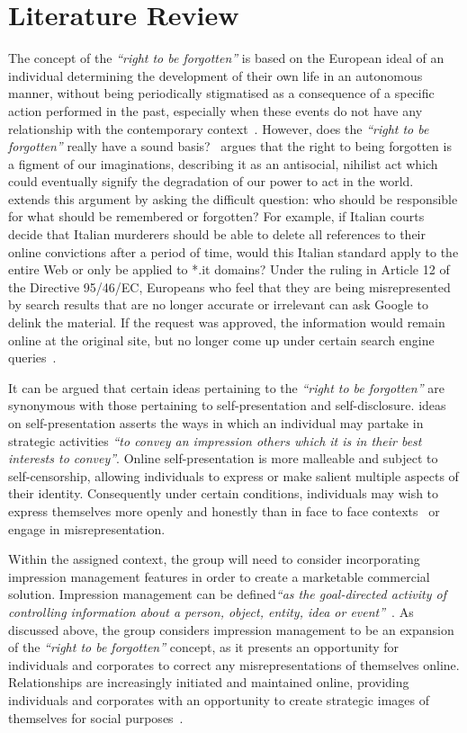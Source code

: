 \section{Literature Review}

The concept of the \emph{``right to be forgotten''} is based on the European ideal of an individual determining the development of their own life in an autonomous manner, without being periodically stigmatised as a consequence of a specific action performed in the past, especially when these events do not have any relationship with the contemporary context~\parencite{art:eu_forgotten}. However, does the \emph{``right to be forgotten''} really have a sound basis?~\textcite{web:no_right_forgotten} argues that the right to being forgotten is a figment of our imaginations, describing it as an antisocial, nihilist act which could eventually signify the degradation of our power to act in the world.~\textcite{web:foggy_thinking} extends this argument by asking the difficult question: who should be responsible for what should be remembered or forgotten? For example, if Italian courts decide that Italian murderers should be able to delete all references to their online convictions after a period of time, would this Italian standard apply to the entire Web or only be applied to *.it domains? Under the ruling in Article 12 of the Directive 95/46/EC, Europeans who feel that they are being misrepresented by search results that are no longer accurate or irrelevant can ask Google to delink the material. If the request was approved, the information would remain online at the original site, but no longer come up under certain search engine queries~\parencite{web:right_to_be_forgotten}. 

It can be argued that certain ideas pertaining to the \emph{``right to be forgotten''} are synonymous with those pertaining to self-presentation and self-disclosure. \textcite{book:self_presentation} ideas on self-presentation asserts the ways in which an individual may partake in strategic activities \emph{``to convey an impression others which it is in their best interests to convey''}. Online self-presentation is more malleable and subject to self-censorship, allowing individuals to express or make salient multiple aspects of their identity. Consequently under certain conditions, individuals may wish to express themselves more openly and honestly than in face to face contexts~\parencite{art:manage_impress} or engage in misrepresentation.

Within the assigned context, the group will need to consider incorporating impression management features in order to create a marketable commercial solution. Impression management can be defined\emph{``as the goal-directed activity of controlling information about a person, object, entity, idea or event''}~\parencite{art:appearing_competent}. As discussed above, the group considers impression management to be an expansion of the \emph{``right to be forgotten''} concept, as it presents an opportunity for individuals and corporates to correct any misrepresentations of themselves online. Relationships are increasingly initiated and maintained online, providing individuals and corporates with an opportunity to create strategic images of themselves for social purposes~\parencite{art:olm}.

